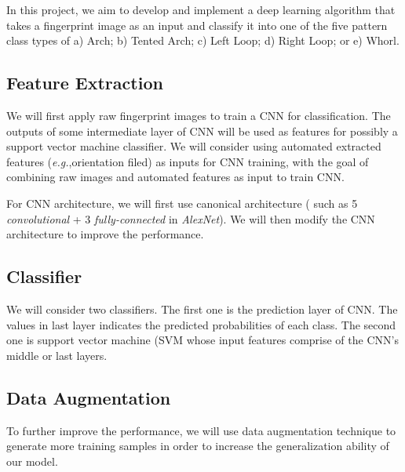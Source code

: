 
In this project, we aim to develop and implement a deep learning algorithm that takes a fingerprint image as an input and classify it into one of the five pattern class types of a) Arch; b) Tented Arch; c) Left Loop; d) Right Loop; or e) Whorl. 

\subsection{Feature Extraction}
%
We will first apply raw fingerprint images to train a CNN for classification. The outputs of some intermediate layer  of CNN will be used as features for possibly a support vector machine classifier.
%
We will consider using automated extracted features (\textit{e.g.},orientation filed) as inputs for CNN training, with the goal of combining raw images and automated features as input to train CNN.

For CNN architecture, we will first use canonical architecture ( such as 5 \textit{convolutional} + 3 \textit{fully-connected} in \textit{AlexNet}\cite{krizhevsky2012imagenet}). We will then modify the CNN architecture to improve the performance.
%
\subsection{Classifier}
%
We will consider two classifiers. The first one is the prediction layer of CNN. The values in last layer indicates the predicted probabilities of each class.
%
The second one is support vector machine (SVM whose input features comprise of the CNN’s middle or last layers.

\subsection{Data Augmentation}
%
To further improve the performance, we will use data augmentation technique to generate more training samples in order to increase the generalization ability of our model.
